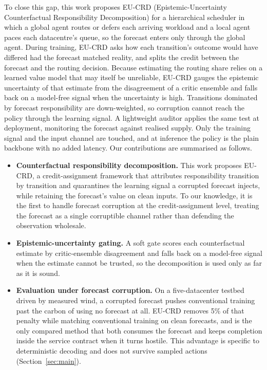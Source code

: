 \documentclass{article} %
\newcommand{\ResContain}{5\%}          %
\begin{document}
To close this gap, this work proposes EU-CRD (Epistemic-Uncertainty Counterfactual Responsibility Decomposition) for a hierarchical scheduler in which a global agent routes or defers each arriving workload and a local agent paces each datacentre's queue, so the forecast enters only through the global agent. During training, EU-CRD asks how each transition's outcome would have differed had the forecast matched reality, and splits the credit between the forecast and the routing decision. Because estimating the routing share relies on a learned value model that may itself be unreliable, EU-CRD gauges the epistemic uncertainty of that estimate from the disagreement of a critic ensemble and falls back on a model-free signal when the uncertainty is high. Transitions dominated by forecast responsibility are down-weighted, so corruption cannot reach the policy through the learning signal. A lightweight auditor applies the same test at deployment, monitoring the forecast against realised supply. Only the training signal and the input channel are touched, and at inference the policy is the plain backbone with no added latency. Our contributions are summarised as follows.
\begin{itemize}
\setlength{\itemsep}{0pt}\setlength{\topsep}{2pt}\setlength{\parskip}{0pt}
\item \textbf{Counterfactual responsibility decomposition.} This work proposes EU-CRD, a credit-assignment framework that attributes responsibility transition by transition and quarantines the learning signal a corrupted forecast injects, while retaining the forecast's value on clean inputs. To our knowledge, it is the first to handle forecast corruption at the credit-assignment level, treating the forecast as a single corruptible channel rather than defending the observation wholesale.
\item \textbf{Epistemic-uncertainty gating.} A soft gate scores each counterfactual estimate by critic-ensemble disagreement and falls back on a model-free signal when the estimate cannot be trusted, so the decomposition is used only as far as it is sound.
\item \textbf{Evaluation under forecast corruption.} On a five-datacenter testbed driven by measured wind, a corrupted forecast pushes conventional training past the carbon of using no forecast at all. EU-CRD removes \ResContain{} of that penalty while matching conventional training on clean forecasts, and is the only compared method that both consumes the forecast and keeps completion inside the service contract when it turns hostile. This advantage is specific to deterministic decoding and does not survive sampled actions (Section~\ref{sec:main}).
\end{itemize}
\end{document}
